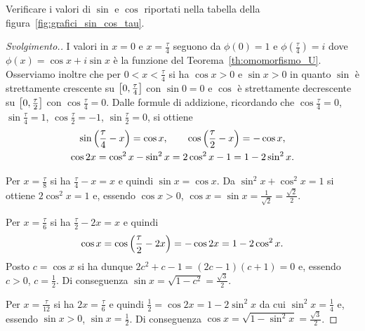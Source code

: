 \begin{exercise}
  \label{ex:valori_notevoli_trigonometria}
  Verificare i valori di $\sin$ e $\cos$ riportati nella tabella 
  della figura~\ref{fig:grafici_sin_cos_tau}.
\end{exercise}
%
\begin{proof}[Svolgimento.]
I valori in $x=0$ e $x=\frac \tau 4$ seguono da $\phi(0)=1$ e $\phi(\frac \tau 4)=i$
dove $\phi(x) = \cos x + i \sin x$ è la funzione del Teorema~\ref{th:omomorfismo_U}.
Osserviamo inoltre che per $0<x<\frac \tau 4$ si ha $\cos x >0$ e $\sin x>0$
in quanto $\sin$ è strettamente crescente su $\left[0,\frac \tau 4\right]$
con $\sin 0=0$ e $\cos$ è strettamente decrescente su $\left[0,\frac \tau 2\right]$ 
con $\cos \frac \tau 4 = 0$.
Dalle formule di addizione, 
ricordando che $\cos\frac \tau 4 = 0$, $\sin \frac \tau 4 = 1$,
$\cos \frac \tau 2 = -1$, $\sin\frac \tau 2 = 0$, si ottiene
\begin{gather*}
  \sin{\left( \frac \tau 4 - x \right)} = \cos x, \qquad
  \cos{\left( \frac \tau 2 - x \right)} = -\cos x, \\
  \cos 2x = \cos^2 x - \sin^2 x = 2\cos^2 x - 1 = 1 - 2 \sin^2 x.
\end{gather*}

Per $x=\frac \tau 8$ si ha $\frac \tau 4 - x = x$ e quindi 
$\sin x = \cos x$.
Da $\sin^2 x + \cos^2 x = 1$ si ottiene $2\cos^2 x = 1$ 
e, essendo $\cos x>0$, $\cos x = \sin x = \frac{1}{\sqrt 2} = \frac{\sqrt 2}2$.

Per $x=\frac \tau 6$ si ha $\frac \tau 2 - 2x = x$ e quindi 
\[
  \cos x = \cos{\left( \frac \tau 2 - 2x \right)} = -\cos 2x = 1 - 2\cos^2 x.
\]
Posto $c = \cos x$ si ha dunque $2c^2 + c - 1 = (2c-1)(c+1) = 0$
e, essendo $c>0$, $c=\frac 1 2$.
Di conseguenza $\sin x = \sqrt{1-c^2} = \frac{\sqrt 3}2$.

Per $x=\frac \tau{12}$ si ha $2x = \frac \tau 6$ e quindi
$\frac 1 2 = \cos 2x = 1 - 2\sin^2 x$ da cui $\sin^2 x = \frac 1 4$
e, essendo $\sin x >0$, $\sin x = \frac 1 2$. 
Di conseguenza $\cos x = \sqrt{1 - \sin^2 x} = \frac{\sqrt 3}2$.
\end{proof}
%

